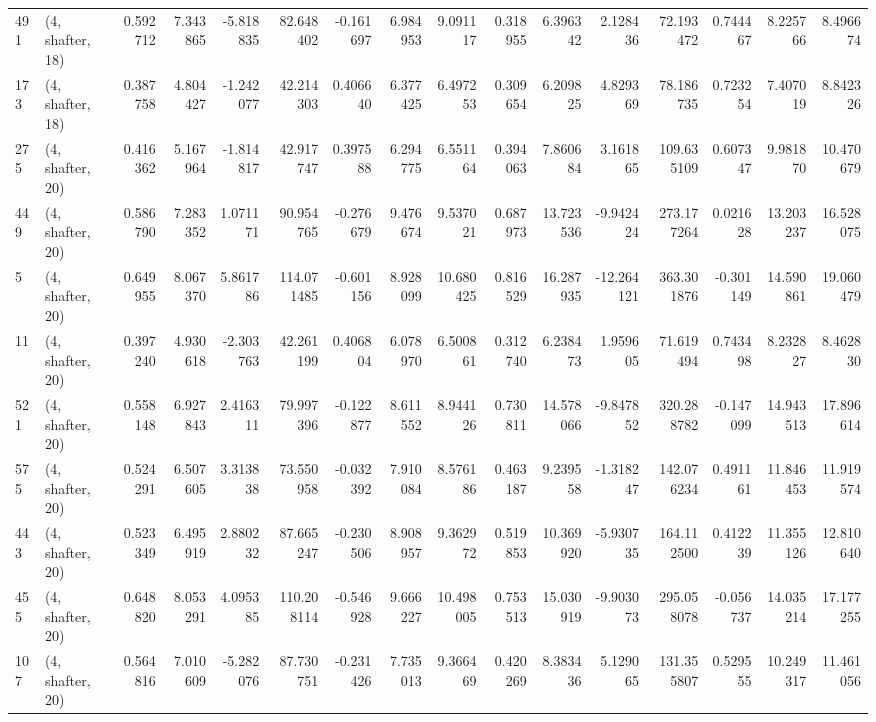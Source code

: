 \begin{tabular}{llrrrrrrrrrrrrrr}
491 &  (4, shafter, 18) &   0.592712 &   7.343865 &  -5.818835 &    82.648402 &  -0.161697 &   6.984953 &   9.091117 &  0.318955 &   6.396342 &   2.128436 &    72.193472 &  0.744467 &   8.225766 &   8.496674 \\
173 &  (4, shafter, 18) &   0.387758 &   4.804427 &  -1.242077 &    42.214303 &   0.406640 &   6.377425 &   6.497253 &  0.309654 &   6.209825 &   4.829369 &    78.186735 &  0.723254 &   7.407019 &   8.842326 \\
275 &  (4, shafter, 20) &   0.416362 &   5.167964 &  -1.814817 &    42.917747 &   0.397588 &   6.294775 &   6.551164 &  0.394063 &   7.860684 &   3.161865 &   109.635109 &  0.607347 &   9.981870 &  10.470679 \\
449 &  (4, shafter, 20) &   0.586790 &   7.283352 &   1.071171 &    90.954765 &  -0.276679 &   9.476674 &   9.537021 &  0.687973 &  13.723536 &  -9.942424 &   273.177264 &  0.021628 &  13.203237 &  16.528075 \\
5   &  (4, shafter, 20) &   0.649955 &   8.067370 &   5.861786 &   114.071485 &  -0.601156 &   8.928099 &  10.680425 &  0.816529 &  16.287935 & -12.264121 &   363.301876 & -0.301149 &  14.590861 &  19.060479 \\
11  &  (4, shafter, 20) &   0.397240 &   4.930618 &  -2.303763 &    42.261199 &   0.406804 &   6.078970 &   6.500861 &  0.312740 &   6.238473 &   1.959605 &    71.619494 &  0.743498 &   8.232827 &   8.462830 \\
521 &  (4, shafter, 20) &   0.558148 &   6.927843 &   2.416311 &    79.997396 &  -0.122877 &   8.611552 &   8.944126 &  0.730811 &  14.578066 &  -9.847852 &   320.288782 & -0.147099 &  14.943513 &  17.896614 \\
575 &  (4, shafter, 20) &   0.524291 &   6.507605 &   3.313838 &    73.550958 &  -0.032392 &   7.910084 &   8.576186 &  0.463187 &   9.239558 &  -1.318247 &   142.076234 &  0.491161 &  11.846453 &  11.919574 \\
443 &  (4, shafter, 20) &   0.523349 &   6.495919 &   2.880232 &    87.665247 &  -0.230506 &   8.908957 &   9.362972 &  0.519853 &  10.369920 &  -5.930735 &   164.112500 &  0.412239 &  11.355126 &  12.810640 \\
455 &  (4, shafter, 20) &   0.648820 &   8.053291 &   4.095385 &   110.208114 &  -0.546928 &   9.666227 &  10.498005 &  0.753513 &  15.030919 &  -9.903073 &   295.058078 & -0.056737 &  14.035214 &  17.177255 \\
107 &  (4, shafter, 20) &   0.564816 &   7.010609 &  -5.282076 &    87.730751 &  -0.231426 &   7.735013 &   9.366469 &  0.420269 &   8.383436 &   5.129065 &   131.355807 &  0.529555 &  10.249317 &  11.461056 \\

\end{tabular}
